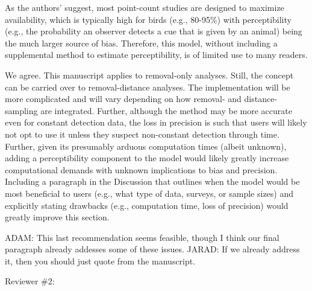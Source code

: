 \documentclass[12pt]{article}
\renewenvironment{quote}  %
              {\list{}{\rightmargin\leftmargin}\normalfont%
               \item\relax}
              {\endlist}
\newcommand{\adam}[1]{{\color{blue} ADAM: #1}}
\newcommand{\jarad}[1]{{\color{Orange} JARAD: #1}}
\begin{document}
As the authors’ suggest, most point-count studies are designed to maximize availability, which is typically high for birds (e.g., 80-95\%) with perceptibility (e.g., the probability an observer detects a cue that is given by an animal) being the much larger source of bias.  Therefore, this model, without including a supplemental method to estimate perceptibility, is of limited use to many readers.
\begin{quote}
We agree.
This manuscript applies to removal-only analyses.
Still, the concept can be carried over to removal-distance analyses.
The implementation will be more complicated and will vary depending on how removal- and distance-sampling are integrated.
\end{quote}
Further, although the method may be more accurate even for constant detection data, the loss in precision is such that users will likely not opt to use it unless they suspect non-constant detection through time.  Further, given its presumably arduous computation times (albeit unknown), adding a perceptibility component to the model would likely greatly increase computational demands with unknown implications to bias and precision.  Including a paragraph in the Discussion that outlines when the model would be most beneficial to users (e.g., what type of data, surveys, or sample sizes) and explicitly stating drawbacks (e.g., computation time, loss of precision) would greatly improve this section.  
\begin{quote}
\adam{This last recommendation seems feasible, though I think our final paragraph already addesses some of these issues.}
\jarad{If we already address it, then you should just quote from the manuscript.}
\end{quote}
\vspace{1.5cm}

\newpage



Reviewer \#2:
\end{document}
